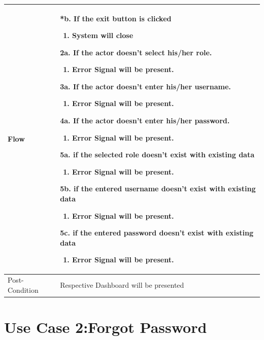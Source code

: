 \documentclass[12pt,a4paper]{report}
\begin{document}
\begin{tabular}{ | m{3cm} | m{12cm}| } \hline

Flow & *b. If the exit button is clicked
	\begin{enumerate}
		\item System will close
	\end{enumerate}

 2a. If the actor doesn't select his/her role.
 	\begin{enumerate}
		\item Error Signal will be present.
	\end{enumerate}
3a. If the actor doesn't enter his/her username.
 	\begin{enumerate}
		\item Error Signal will be present.
	\end{enumerate}
4a. If the actor doesn't enter his/her password.
 	\begin{enumerate}
		\item Error Signal will be present.
	\end{enumerate}
5a. if the selected role doesn't exist with existing data
	\begin{enumerate}
		\item Error Signal will be present.
	\end{enumerate}
5b. if the entered username doesn't exist with existing data
	\begin{enumerate}
		\item Error Signal will be present.
	\end{enumerate}
5c. if the entered password doesn't exist with existing data
	\begin{enumerate}
		\item Error Signal will be present.
	\end{enumerate}
\\ \hline
Post-Condition & Respective Dashboard will be presented   \\\hline
\end{tabular}
\section{Use Case 2:Forgot Password}
\end{document}
